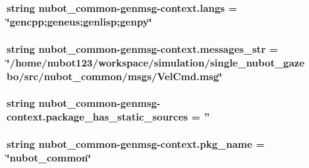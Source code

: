 \hypertarget{namespacenubot__common-genmsg-context_ad47fe39b5ca574c609a0a44451d67ebe}{
\subsubsection[{langs}]{\setlength{\rightskip}{0pt plus 5cm}string nubot\-\_\-common-\/genmsg-\/context.\-langs = \char`\"{}gencpp;geneus;genlisp;genpy\char`\"{}}}\label{namespacenubot__common-genmsg-context_ad47fe39b5ca574c609a0a44451d67ebe}
\hypertarget{namespacenubot__common-genmsg-context_a9d82d20e4ffa677c598751d6630dc734}{
\subsubsection[{messages\-\_\-str}]{\setlength{\rightskip}{0pt plus 5cm}string nubot\-\_\-common-\/genmsg-\/context.\-messages\-\_\-str = \char`\"{}/home/nubot123/workspace/simulation/single\-\_\-nubot\-\_\-gazebo/src/nubot\-\_\-common/msgs/Vel\-Cmd.\-msg\char`\"{}}}\label{namespacenubot__common-genmsg-context_a9d82d20e4ffa677c598751d6630dc734}
\hypertarget{namespacenubot__common-genmsg-context_a9b23bed4614ce829e09eb98736bbcfb6}{
\subsubsection[{package\-\_\-has\-\_\-static\-\_\-sources}]{\setlength{\rightskip}{0pt plus 5cm}string nubot\-\_\-common-\/genmsg-\/context.\-package\-\_\-has\-\_\-static\-\_\-sources = ''}}\label{namespacenubot__common-genmsg-context_a9b23bed4614ce829e09eb98736bbcfb6}
\hypertarget{namespacenubot__common-genmsg-context_aa7e82af182943505146665259b8e1ce9}{
\subsubsection[{pkg\-\_\-name}]{\setlength{\rightskip}{0pt plus 5cm}string nubot\-\_\-common-\/genmsg-\/context.\-pkg\-\_\-name = \char`\"{}nubot\-\_\-common\char`\"{}}}\label{namespacenubot__common-genmsg-context_aa7e82af182943505146665259b8e1ce9}
